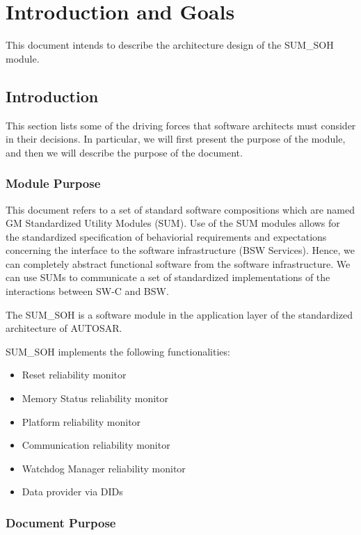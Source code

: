 \chapter{Introduction and Goals}

This document intends to describe the architecture design of the SUM_SOH module.

\section{Introduction}
This section lists some of the driving forces that software architects must consider in their decisions. In particular, we will first present the purpose of the module, and then we will describe the purpose of the document.

\subsection{Module Purpose}

This document refers to a set of standard software compositions which are named GM Standardized Utility Modules (SUM).
Use of the SUM modules allows for the standardized specification of behaviorial requirements and expectations concerning the interface to the software infrastructure (BSW Services).
Hence, we can completely abstract functional software from the software infrastructure.
We can use SUMs to communicate a set of standardized implementations of the interactions between SW-C and BSW.

The SUM_SOH is a software module in the application layer of the standardized architecture of AUTOSAR.

SUM_SOH implements the following functionalities:

\begin{itemize}
	\item Reset reliability monitor
	\item Memory Status reliability monitor
	\item Platform reliability monitor
	\item Communication reliability monitor
	\item Watchdog Manager reliability monitor
	\item Data provider via DIDs
\end{itemize}



\subsection{Document Purpose}

